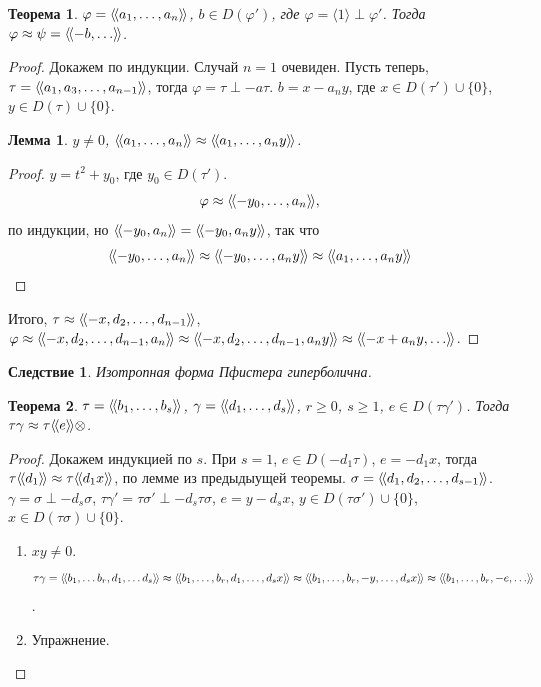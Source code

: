 \documentclass{article}
\newenvironment{enum}[2][\parindent]{\begin{enumerate}[nosep, wide, labelindent = #1, label = #2]}{\end{enumerate}}
\newtheorem*{theorem}{Теорема}
\newtheorem*{corollary}{Следствие}
\newtheorem*{lemma}{Лемма}
\theoremstyle{definition}
\theoremstyle{remark}
\newcommand{\llangle}{\langle \hspace{-.5mm} \langle}
\newcommand{\rrangle}{\rangle \hspace{-.5mm} \rangle}
\begin{document}
\begin{theorem}
    $\varphi = \llangle a_1, \ldots, a_n \rrangle$, $b \in D(\varphi')$, где $\varphi = \langle 1 \rangle \perp \varphi'$. Тогда $\varphi \approx \psi = \llangle -b, \ldots \rrangle$.
\end{theorem}
\begin{proof}
    Докажем по индукции. Случай $n = 1$ очевиден. Пусть теперь, $\tau = \llangle a_1, a_3, \ldots, a_{n - 1} \rrangle$, тогда $\varphi = \tau \perp -a\tau$. $b = x - a_n y$, где $x \in D(\tau') \cup \{0\}$, $y \in D(\tau) \cup \{0\}$.
    \begin{lemma}
        $y \neq 0$, $\llangle a_1, \ldots, a_n \rrangle \approx \llangle a_1, \ldots, a_n y \rrangle$.
    \end{lemma}
    \begin{proof}
        $y = t^2 + y_0$, где $y_0 \in D(\tau')$.
        $$\varphi \approx \llangle -y_0, \ldots, a_n \rrangle,$$
        по индукции, но $\llangle -y_0, a_n \rrangle = \llangle -y_0, a_n y \rrangle$, так что 
        $$\llangle -y_0, \ldots, a_n \rrangle \approx \llangle -y_0, \ldots, a_n y \rrangle \approx \llangle a_1, \ldots, a_n y \rrangle$$
    \end{proof}
    Итого,
    $\tau \approx \llangle -x, d_2, \ldots, d_{n - 1} \rrangle$, $\varphi \approx \llangle -x, d_2, \ldots, d_{n - 1}, a_n \rrangle \approx \llangle -x, d_2, \ldots, d_{n - 1}, a_ny \rrangle \approx \llangle -x + a_n y, \ldots \rrangle$.
\end{proof}

\begin{corollary}
    Изотропная форма Пфистера гиперболична.
\end{corollary}

\begin{theorem}
    $\tau = \llangle b_1, \ldots, b_s \rrangle$, $\gamma = \llangle d_1, \ldots, d_s \rrangle$, $r \geq 0$, $s \geq 1$, $e \in D(\tau \gamma')$. Тогда $\tau \gamma \approx \tau \llangle e \rrangle \otimes$.
\end{theorem}
\begin{proof}
    Докажем индукцией по $s$. При $s = 1$, $e \in D(-d_1 \tau)$, $e = -d_1 x$, тогда $\tau\llangle d_1 \rrangle \approx \tau \llangle d_1 x \rrangle$, по лемме из предыдыущей теоремы.
    $\sigma = \llangle d_1, d_2, \ldots, d_{s - 1} \rrangle$. $\gamma = \sigma \perp -d_s \sigma$, $\tau\gamma' = \tau\sigma' \perp -d_s \tau\sigma$, $e = y - d_s x$, $y \in D(\tau \sigma') \cup \{0 \}$, $x \in D(\tau \sigma) \cup \{0\}$.
    \begin{enum}{\arabic*)}
        \item $xy \neq 0$.
        $$\tau \gamma = \llangle b_1, \ldots b_r, d_1, \ldots d_s \rrangle \approx \llangle b_1, \ldots, b_r, d_1, \ldots, d_sx \rrangle \approx \llangle b_1, \ldots, b_r, -y, \ldots, d_s x \rrangle \approx \llangle b_1, \ldots, b_r, -e, \ldots \rrangle$$.
        \item Упражнение.
    \end{enum}
\end{proof}
\end{document}
